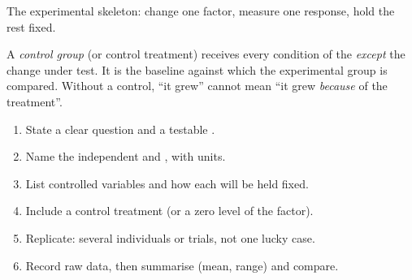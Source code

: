 \begin{omfigure}

{\small The experimental skeleton: change one factor, measure one
response, hold the rest fixed.}
\end{omfigure}

\begin{definition}\label{def:g10:scientific-biology:control}
A \emph{control group} (or control treatment)
receives every condition of the  \emph{except} the change
under test. It is the baseline against which the experimental group
is compared. Without a control, ``it grew'' cannot mean ``it grew
\emph{because} of the treatment''.
\end{definition}

\begin{method}\label{met:g10:scientific-biology:fair-test}
\begin{enumerate}
  \item State a clear question and a testable .
  \item Name the independent and , with units.
  \item List controlled variables and how each will be held fixed.
  \item Include a control treatment (or a zero level of the factor).
  \item Replicate: several individuals or trials, not one lucky case.
  \item Record raw data, then summarise (mean, range) and compare.
\end{enumerate}
\end{method}

